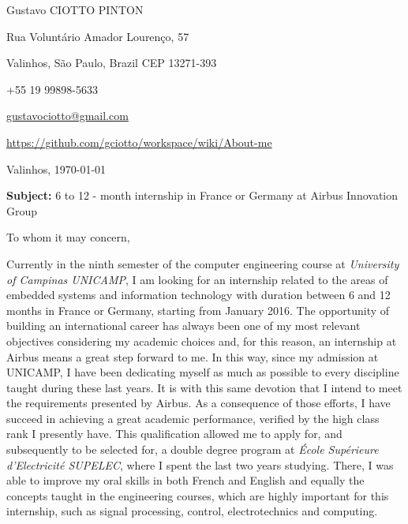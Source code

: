 \documentclass[12pt, a4paper]{article}
\begin{document}
\pagestyle{empty} 

Gustavo CIOTTO PINTON

Rua Voluntário Amador Lourenço, 57

Valinhos, São Paulo, Brazil CEP 13271-393

+55 19 99898-5633

 \url{gustavociotto@gmail.com}

\url{https://github.com/gciotto/workspace/wiki/About-me}
\begin{flushright}
\vspace{-12pt}
Valinhos,  \today





\end{flushright}

\textbf{Subject:} 6 to 12 - month internship in France or Germany at Airbus
Innovation Group

\vspace{12pt} 

To whom it may concern, 

\vspace{12pt}
Currently in the ninth semester of the computer engineering course at
\textit{University of Campinas UNICAMP}, I am looking for an internship related
to the areas of embedded systems and information technology with duration
between 6 and 12 months in France or Germany, starting from January 2016. The
opportunity of building an international career has always been one of my most
relevant objectives considering my academic choices and, for this reason, an
internship at Airbus means a great step forward to me. In this way, since my
admission at UNICAMP, I have been dedicating myself as much as possible to every
discipline taught during these last years. It is with this same devotion that I
intend to meet the requirements presented by Airbus. As a consequence of those
efforts, I have succeed in achieving a great academic performance, verified by
the high class rank I presently have. This qualification allowed me to apply
for, and subsequently to be selected for, a double degree program at
\textit{École Supérieure d'Electricité SUPELEC}, where I spent the last two
years studying. There, I was able to improve my oral skills in both French and English and
equally the concepts taught in the engineering courses, which are highly
important for this internship, such as signal processing, control,
electrotechnics and computing.
\end{document}
